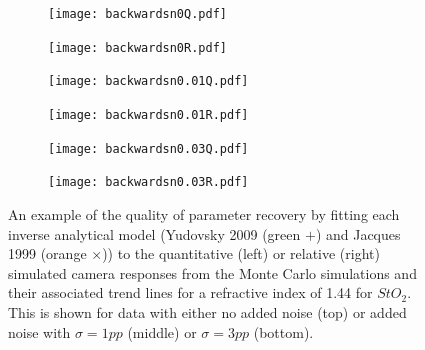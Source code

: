 \begin{figure}[h!]
    \centering
    \begin{subfigure}{0.49\textwidth}
        \texttt{[image: backwardsn0Q.pdf]}
        \caption{}
        \label{fig:backwardsn0Q}
    \end{subfigure}
    \begin{subfigure}{0.49\textwidth}
        \texttt{[image: backwardsn0R.pdf]}
        \caption{}
        \label{fig:backwardsn0R}
    \end{subfigure}
    \begin{subfigure}{0.49\textwidth}
        \texttt{[image: backwardsn0.01Q.pdf]}
        \caption{}
        \label{fig:backwardsn0.01Q}
    \end{subfigure}
    \begin{subfigure}{0.49\textwidth}
        \texttt{[image: backwardsn0.01R.pdf]}
        \caption{}
        \label{fig:backwardsm0.01R}
    \end{subfigure}
    \begin{subfigure}{0.49\textwidth}
        \texttt{[image: backwardsn0.03Q.pdf]}
        \caption{}
        \label{fig:backwardsn0.03Q}
    \end{subfigure}
    \begin{subfigure}{0.49\textwidth}
        \texttt{[image: backwardsn0.03R.pdf]}
        \caption{}
        \label{fig:backwardsm0.03R}
    \end{subfigure}
    \caption{An example of the quality of parameter recovery by fitting each inverse analytical model (Yudovsky 2009 (\textcolor{MyGreen}{green $+$}) and Jacques 1999 (\textcolor{MyOrange}{orange $\times$})) to the quantitative (left) or relative (right) simulated camera responses from the Monte Carlo simulations and their associated trend lines for a refractive index of 1.44 for $StO_2$. This is shown for data with either no added noise (top) or added noise with $\sigma = 1pp$ (middle) or $\sigma = 3pp$ (bottom).}
    \label{fig:backwardsHSIMC1}
\end{figure}

